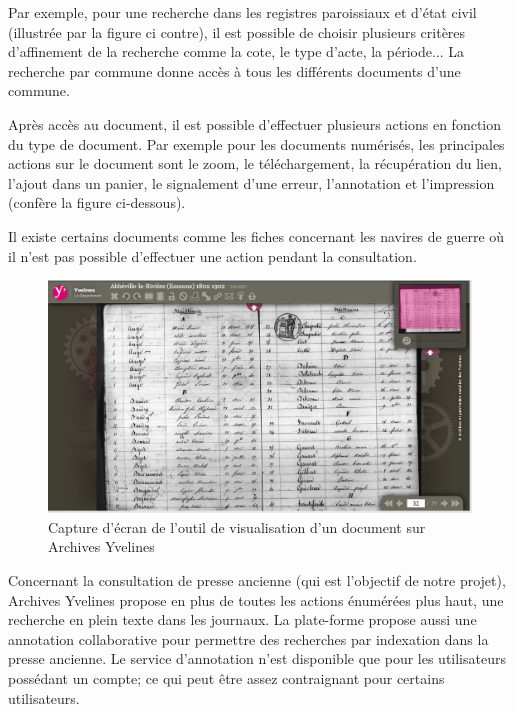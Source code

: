         Par exemple, pour une recherche dans les registres paroissiaux et d’état civil (illustrée par la figure ci contre),
        il est possible de choisir plusieurs critères d’affinement de la recherche comme la cote, le type d’acte, la période...
        La recherche par commune donne accès à tous les différents documents d’une commune.

        Après accès au document, il est possible d’effectuer plusieurs actions en fonction du type de document.
        Par exemple pour les documents numérisés, les principales actions sur le document sont le zoom, le téléchargement,
        la récupération du lien, l’ajout dans un panier, le signalement d’une erreur, l’annotation et l’impression (confère la figure ci-dessous).

        Il existe certains documents comme les fiches concernant les navires de guerre où il n’est pas possible d’effectuer
        une action pendant la consultation.

        \begin{figure}[h!]
            \centering
            \includegraphics[width=1\textwidth]{figure/screen_yvelines_document.png}
            \caption{Capture d'écran de l'outil de visualisation d'un document sur Archives Yvelines}
            \label{fig:yvelines_doc}
        \end{figure}

        Concernant la consultation de presse ancienne (qui est l’objectif de notre projet), Archives Yvelines propose en plus
        de toutes les actions énumérées plus haut, une recherche en plein texte dans les journaux. La plate-forme propose
        aussi une annotation collaborative pour permettre des recherches par indexation dans la presse ancienne. Le service d’annotation
        n’est disponible que pour les utilisateurs possédant un compte; ce qui peut être assez contraignant pour certains utilisateurs.

